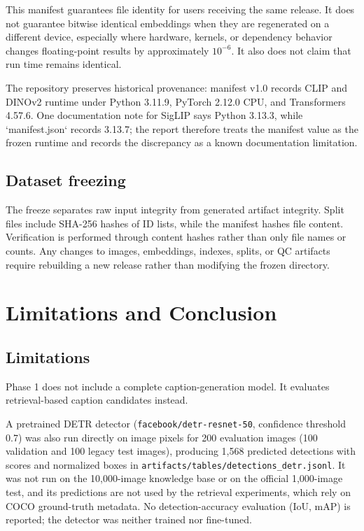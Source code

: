 \documentclass{article}
\begin{document}
This manifest guarantees file identity for users receiving the same
release. It does not guarantee bitwise identical embeddings when they
are regenerated on a different device, especially where hardware,
kernels, or dependency behavior changes floating-point results by
approximately \(10^{-6}\). It also does not claim that
run time remains identical.

The repository preserves historical provenance: manifest v1.0 records
CLIP and DINOv2 runtime under Python 3.11.9, PyTorch 2.12.0 CPU, and
Transformers 4.57.6. One documentation note for SigLIP says Python
3.13.3, while `manifest.json` records 3.13.7; the report therefore
treats the manifest value as the frozen runtime and records the
discrepancy as a known documentation limitation.

\subsection{Dataset freezing}\label{dataset-freezing}

The freeze separates raw input integrity from generated artifact
integrity. Split files include SHA-256 hashes of ID lists, while the
manifest hashes file content. Verification is performed through content
hashes rather than only file names or counts. Any changes to images,
embeddings, indexes, splits, or QC artifacts require rebuilding a new
release rather than modifying the frozen directory.

\section{Limitations and
Conclusion}\label{limitations-and-conclusion}

\subsection{Limitations}\label{limitations}

Phase 1 does not include a complete caption-generation model.
It evaluates retrieval-based caption candidates instead.

A pretrained DETR detector (\texttt{facebook/detr-resnet-50}, confidence
threshold 0.7) was also run directly on image pixels for 200 evaluation
images (100 validation and 100 legacy test images), producing 1,568 predicted
detections with scores and normalized boxes in
\texttt{artifacts/tables/detections\_detr.jsonl}. It was not run on the
10,000-image knowledge base or on the official 1,000-image test, and its
predictions are not used by the retrieval experiments, which rely on COCO
ground-truth metadata. No detection-accuracy evaluation (IoU, mAP) is
reported; the detector was neither trained nor fine-tuned.
\end{document}
